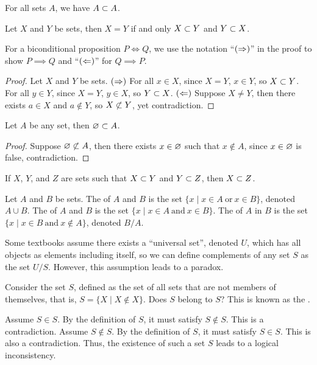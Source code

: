 \documentclass[10pt]{article}
\begin{document}
\begin{example}
    For all sets $A$, we have $A\subset A$.
\end{example}
\begin{proposition}
    Let $X$ and $Y$ be sets, then $X=Y$ if and only $X\subset Y$ and $Y\subset X$.
\end{proposition}
\begin{remark}
    For a biconditional proposition $P\iff Q$, we use the notation ``$(\Rightarrow)$'' in the proof to show $P\implies Q$ and ``$(\Leftarrow)$'' for $Q\implies P$.
\end{remark}
\begin{proof}
    Let $X$ and $Y$ be sets. $(\Rightarrow)$ For all $x\in X$, since $X=Y$, $x\in Y$, so $X\subset Y$. For all $y\in Y$, since $X=Y$, $y\in X$, so $Y\subset X$. $(\Leftarrow)$ Suppose $X\ne Y$, then there exists $a\in X$ and $a\notin Y$, so $X\nsub Y$, yet contradiction. 
\end{proof}
\begin{proposition}
    Let $A$ be any set, then $\varnothing\subset A$.
\end{proposition}
\begin{proof}
    Suppose $\es\nsub A$, then there exists $x\in\varnothing$ such that $x\notin A$, since $x\in\varnothing$ is false, contradiction.
\end{proof}
\begin{example}
    If $X$, $Y$, and $Z$ are sets such that $X\subset Y$ and $Y\subset Z$, then $X\subset Z$.
\end{example}
\begin{definition}
    Let $A$ and $B$ be sets. The  of $A$ and $B$ is the set $\{x\mid x\in A\ \text{or}\ x\in B\}$, denoted $A\cup B$. The  of $A$ and $B$ is the set $\{x\mid x\in A\ \text{and}\ x\in B\}$. The  of $A$ in $B$ is the set $\{x\mid x\in B\ \text{and}\ x\notin A\}$, denoted $B/A$.
\end{definition}
\par
Some textbooks assume there exists a ``universal set'', denoted $U$, which has all objects as elements including itself, so we can define complements of any set $S$ as the set $U/S$. However, this assumption leads to a paradox. 
\begin{example}
    Consider the set $S$, defined as the set of all sets that are not members of themselves, that is, $S=\{X\mid X\notin X\}$. Does $S$ belong to $S$? This is known as the .
\end{example}
\par
Assume $S\in S$. By the definition of $S$, it must satisfy $S\notin S$. This is a contradiction. Assume $S \notin S$. By the definition of $S$, it must satisfy $S\in S$. This is also a contradiction. Thus, the existence of such a set $S$ leads to a logical inconsistency. 
\end{document}
